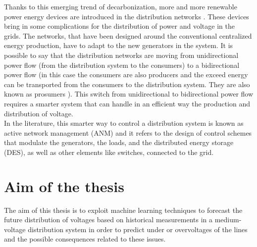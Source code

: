 Thanks to this emerging trend of decarbonization, more and more renewable power energy devices are introduced in the distribution networks \cite{owidenergy}. These devices bring in some complications for the distribution of power and voltage in the grids. The networks, that have been designed around the conventional centralized energy production, have to adapt to the new generators in the system. It is possible to say that the distribution networks are moving from unidirectional power flow (from the distribution system to the consumers) to a bidirectional power flow (in this case the consumers are also producers and the exceed energy can be transported from the consumers to the distribution system. They are also known as prosumers \cite{prosumers}). This switch from unidirectional to bidirectional power flow requires a smarter system that can handle in an efficient way the production and distribution of voltage.\\

In the literature, this smarter way to control a distribution system is known as active network management (\gls{ANM}) and it refers to the design of control schemes that modulate the generators, the loads, and the distributed energy storage (\gls{DES}), as well as other elements like switches, connected to the grid. \\


\section{Aim of the thesis}
\label{sec:aimthesis}
The aim of this thesis is to exploit machine learning techniques to forecast the future distribution of voltages based on historical measurements in a medium-voltage distribution system in order to predict under or overvoltages of the lines and the possible consequences related to these issues. 



